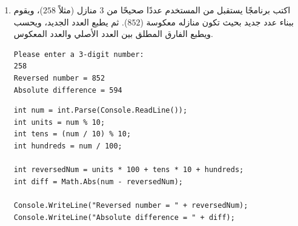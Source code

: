 \documentclass[14pt]{extarticle}
\begin{document}
\begin{enumerate}[itemsep=2em]
\begin{boxSolution}
\begin{english}
\begin{verbatim}
int bills200 = amount / 200;
amount = amount % 200;

int bills100 = amount / 100;
amount = amount % 100;

int bills50 = amount / 50;

Console.WriteLine("200 bills: " + bills200);
Console.WriteLine("100 bills: " + bills100);
Console.WriteLine("50 bills: " + bills50);
\end{verbatim}
\end{english}
\end{boxSolution}
\fi
\filbreak

\item
اكتب برنامجًا يستقبل من المستخدم عددًا صحيحًا من $3$ منازل (مثلاً $258$)، ويقوم ببناء عدد جديد بحيث تكون منازله معكوسة ($852$). ثم يطبع العدد الجديد، ويحسب ويطبع الفارق المطلق بين العدد الأصلي والعدد المعكوس.
\ifdetailed
\begin{boxExample}
\begin{english}
\begin{verbatim}
Please enter a 3-digit number:
258
Reversed number = 852
Absolute difference = 594
\end{verbatim}
\end{english}
\end{boxExample}
\fi
\ifwithsols
\begin{boxSolution}
\begin{english}
\begin{verbatim}
int num = int.Parse(Console.ReadLine());
int units = num % 10;
int tens = (num / 10) % 10;
int hundreds = num / 100;

int reversedNum = units * 100 + tens * 10 + hundreds;
int diff = Math.Abs(num - reversedNum);

Console.WriteLine("Reversed number = " + reversedNum);
Console.WriteLine("Absolute difference = " + diff);
\end{verbatim}
\end{english}
\end{boxSolution}
\fi
\filbreak


\end{enumerate}
\end{document}
